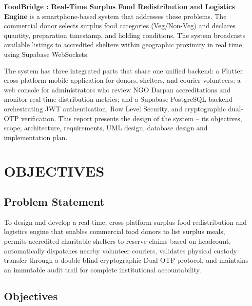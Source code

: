 \documentclass[12pt,a4paper]{article}
\begin{document}
\textbf{FoodBridge : Real-Time Surplus Food Redistribution and Logistics Engine} is a smartphone-based system that addresses these problems. The commercial donor selects surplus food categories (Veg/Non-Veg) and declares quantity, preparation timestamp, and holding conditions. The system broadcasts available listings to accredited shelters within geographic proximity in real time using Supabase WebSockets.

The system has three integrated parts that share one unified backend: a Flutter cross-platform mobile application for donors, shelters, and courier volunteers; a web console for administrators who review NGO Darpan accreditations and monitor real-time distribution metrics; and a Supabase PostgreSQL backend orchestrating JWT authentication, Row Level Security, and cryptographic dual-OTP verification. This report presents the design of the system -- its objectives, scope, architecture, requirements, UML design, database design and implementation plan.

\newpage
\section{OBJECTIVES}

\subsection{Problem Statement}
To design and develop a real-time, cross-platform surplus food redistribution and logistics engine that enables commercial food donors to list surplus meals, permits accredited charitable shelters to reserve claims based on headcount, automatically dispatches nearby volunteer couriers, validates physical custody transfer through a double-blind cryptographic Dual-OTP protocol, and maintains an immutable audit trail for complete institutional accountability.

\subsection{Objectives}
\end{document}
